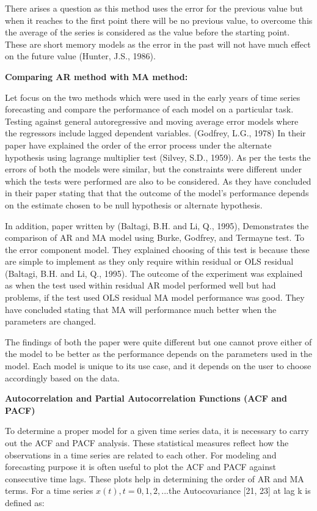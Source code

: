 \documentclass[12pt,a4paper]{book}
\begin{document}
{There arises a question as this method uses the error for the previous
value but when it reaches to the first point there will be no previous
value, to overcome this the average of the series is considered as the
value before the starting point. These are short memory models as the
error in the past will not have much effect on the future value (Hunter,
J.S., 1986).

\textbf{Comparing AR method with MA method:}

Let focus on the two methods which were used in the early years of time
series forecasting and compare the performance of each model on a
particular task. Testing against general autoregressive and moving
average error models where the regressors include lagged dependent
variables. (Godfrey, L.G., 1978) In their paper have explained the order
of the error process under the alternate hypothesis using lagrange
multiplier test (Silvey, S.D., 1959). As per the tests the errors of
both the models were similar, but the constraints were different under
which the tests were performed are also to be considered. As they have
concluded in their paper stating that that the outcome of the model's
performance depends on the estimate chosen to be null hypothesis or
alternate hypothesis.

In addition, paper written by (Baltagi, B.H. and Li, Q., 1995),
Demonstrates the comparison of AR and MA model using Burke, Godfrey, and
Termayne test. To the error component model. They explained choosing of
this test is because these are simple to implement as they only require
within residual or OLS residual (Baltagi, B.H. and Li, Q., 1995). The
outcome of the experiment was explained as when the test used within
residual AR model performed well but had problems, if the test used OLS
residual MA model performance was good. They have concluded stating that
MA will performance much better when the parameters are changed.

The findings of both the paper were quite different but one cannot prove
either of the model to be better as the performance depends on the
parameters used in the model. Each model is unique to its use case, and
it depends on the user to choose accordingly based on the data.

\textbf{Autocorrelation and Partial Autocorrelation Functions (ACF and
PACF)}

To determine a proper model for a given time series data, it is
necessary to carry out the ACF and PACF analysis. These statistical
measures reflect how the observations in a time series are related to
each other. For modeling and forecasting purpose it is often useful to
plot the ACF and PACF against consecutive time lags. These plots help in
determining the order of AR and MA terms. For a time series
\({x(t),t = 0,1, 2,...}\)the Autocovariance {[}21, 23{]} at lag k is
defined as:

}
\end{document}
